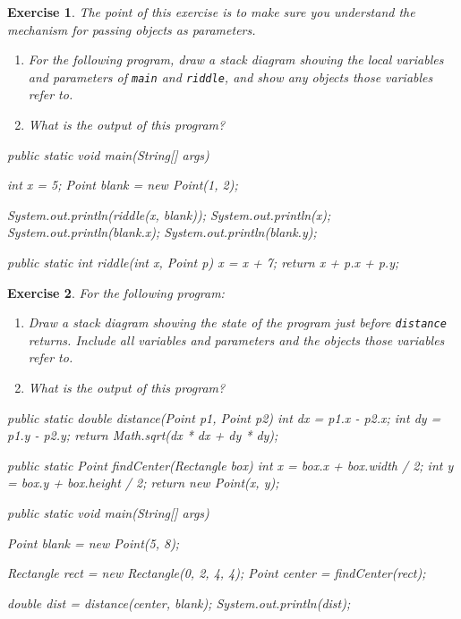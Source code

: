 \documentclass[12pt]{book}
\theoremstyle{exercise}
\newtheorem{exercise}{Exercise}[chapter]
\newcommand{\java}[1]{\verb"#1"}
\newcommand{\java}[1]{\lstinline{#1}} %
\begin{document}
\begin{exercise}
The point of this exercise is to make sure you understand the mechanism for passing objects as parameters.

\begin{enumerate}

\item For the following program, draw a stack diagram showing the local variables and parameters of \java{main} and \java{riddle}, and show any objects those variables refer to.

\item What is the output of this program?

\end{enumerate}

\begin{code}
    public static void main(String[] args) {
        int x = 5;
        Point blank = new Point(1, 2);

        System.out.println(riddle(x, blank));
        System.out.println(x);
        System.out.println(blank.x);
        System.out.println(blank.y);
    }

    public static int riddle(int x, Point p) {
        x = x + 7;
        return x + p.x + p.y;
    }
\end{code}

\end{exercise}


\begin{exercise}
For the following program:

\begin{enumerate}

\item Draw a stack diagram showing the state of the program just before \java{distance} returns.
Include all variables and parameters and the objects those variables refer to.

\item What is the output of this program?

\end{enumerate}

\begin{code}
    public static double distance(Point p1, Point p2) {
        int dx = p1.x - p2.x;
        int dy = p1.y - p2.y;
        return Math.sqrt(dx * dx + dy * dy);
    }

    public static Point findCenter(Rectangle box) {
        int x = box.x + box.width / 2;
        int y = box.y + box.height / 2;
        return new Point(x, y);
    }

    public static void main(String[] args) {
        Point blank = new Point(5, 8);

        Rectangle rect = new Rectangle(0, 2, 4, 4);
        Point center = findCenter(rect);

        double dist = distance(center, blank);
        System.out.println(dist);
    }
\end{code}

\end{exercise}
\end{document}
